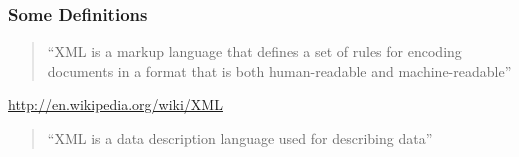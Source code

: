 \documentclass{beamer}\usepackage[]{graphicx}\usepackage[]{color}
\begin{document}

{ %
    \begin{frame}[plain]
     \end{frame}
}


\begin{frame}
\frametitle{Some Definitions}

\begin{quotation}
``XML is a markup language that defines a set of rules for encoding documents in a format that is both human-readable and machine-readable''
\end{quotation}

{\footnotesize 
\hspace{8mm} \url{http://en.wikipedia.org/wiki/XML}
}

\bigskip
\begin{quotation}
``XML is a data description language used for describing data''
\end{quotation}

{\footnotesize 
\hspace{8mm}  \\
\hspace{8mm} 
}

\end{frame}
\end{document}
